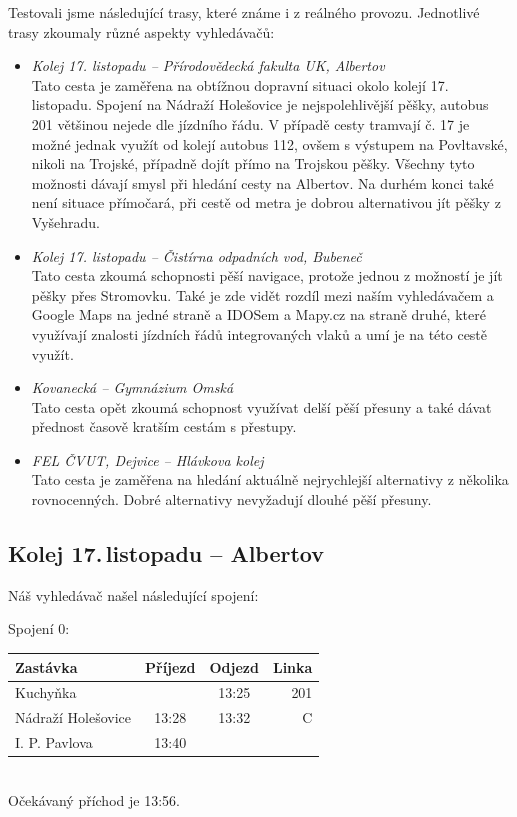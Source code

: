 Testovali jsme následující trasy, které známe i z reálného provozu. Jednotlivé
trasy zkoumaly různé aspekty vyhledávačů:
\begin{itemize}
	\item {\em Kolej 17. listopadu -- Přírodovědecká fakulta UK, Albertov}\\ Tato
	cesta je zaměřena na obtížnou dopravní situaci okolo kolejí 17.
	listopadu. Spojení na Nádraží Holešovice je nejspolehlivější pěšky,
	autobus 201 většinou nejede dle jízdního řádu. V případě cesty tramvají
	č. 17 je možné jednak využít od kolejí autobus 112, ovšem s výstupem na
	Povltavské, nikoli na Trojské, případně dojít přímo na Trojskou pěšky.
	Všechny tyto možnosti dávají smysl při hledání cesty na Albertov. Na
	durhém konci také není situace přímočará, při cestě od metra je dobrou
	alternativou jít pěšky z Vyšehradu. 
	\item {\em Kolej 17. listopadu -- Čistírna odpadních vod, Bubeneč}\\ Tato
	cesta zkoumá schopnosti pěší navigace, protože jednou z možností je jít
	pěšky přes Stromovku. Také je zde vidět rozdíl mezi naším vyhledávačem a
	Google Maps na jedné straně a IDOSem a Mapy.cz na straně druhé, které
	využívají znalosti jízdních řádů integrovaných vlaků a umí je na této
	cestě využít.
	\item {\em Kovanecká -- Gymnázium Omská}\\ Tato cesta opět zkoumá schopnost
	využívat delší pěší přesuny a také dávat přednost časově kratším cestám
	s přestupy. 
	\item {\em FEL ČVUT, Dejvice -- Hlávkova kolej}\\ Tato cesta je zaměřena na
	hledání aktuálně nejrychlejší alternativy z několika rovnocenných. Dobré
	alternativy nevyžadují dlouhé pěší přesuny.
\end{itemize}
\subsection{Kolej 17.\,listopadu -- Albertov}

Náš vyhledávač našel následující spojení:

Spojení 0:\\[2mm]
\begin{tabular}{|l|c|c|r|}\hline
{\bf Zastávka}&{\bf Příjezd}&{\bf Odjezd}&{\bf Linka}\\\hline
Kuchyňka&&13:25&201\\\hline
Nádraží Holešovice&13:28&13:32&C\\\hline
I. P. Pavlova&13:40&&\\\hline
\end{tabular} \\[2mm]
Očekávaný příchod je 13:56.

